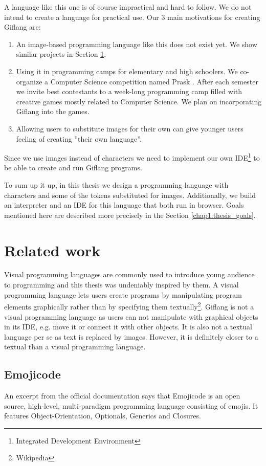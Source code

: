 A language like this one is of course impractical and hard to follow. We do not intend to create a language
for practical use. Our $3$ main motivations for creating Giflang are:
\begin{enumerate}
\item An image-based programming language like this does not exist yet. We show similar projects in Section \ref{chap1:related_work}. 
\item Using it in programming camps for elementary and high schoolers. We co-organize a Computer Science competition
named Prask \cite{Prask}. After each semester we invite best contestants to a week-long programming camp
filled with creative games mostly related to Computer Science. We plan on incorporating Giflang into the games.
\item Allowing users to substitute images for their own can give younger users feeling of creating ''their own language''.
\end{enumerate}

Since we use images instead of characters we need to implement our own IDE\footnote{Integrated Development Environment} to be able to
create and run Giflang programs.

To sum up it up, in this thesis we design a programming language with characters and some of the tokens substituted for images.
Additionally, we build an interpreter and an IDE for this language that both run in browser. Goals mentioned here are described
more precisely in the Section \ref{chap1:thesis_goals}. 

\section{Related work}
\label{chap1:related_work}
Visual programming languages are commonly used to introduce young audience to programming and this thesis was undeniably inspired by them. A visual 
programming language lets users create programs by manipulating program elements graphically rather than by specifying them textually\footnote{Wikipedia}.
Giflang is not a visual programming language as users can not manipulate with graphical objects in its IDE, e.g. move it or connect it with other
objects. It is also not a textual language per se as text is replaced by images. However, it is definitely closer to a textual than
a visual programming language.

\subsection{Emojicode}
An excerpt from the official documentation says that Emojicode \cite{Emojicode} is an open source, high-level, multi-paradigm programming language consisting of emojis.
It features Object-Orientation, Optionals, Generics and Closures.

